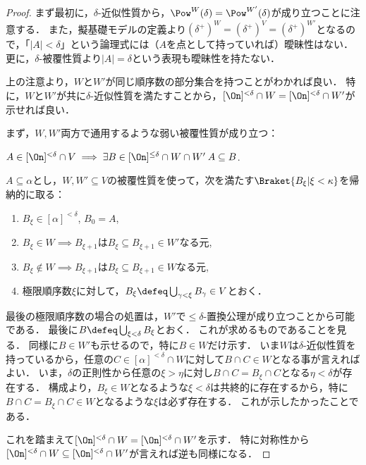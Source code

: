 \documentclass[a4j,leqno]{ltjsarticle}
\theoremstyle{nonumberplain}
\begin{document}
\begin{proof}
 まず最初に，$\delta$-近似性質から，$\Pow^W(\delta) = \Pow^{W'}(\delta)$が成り立つことに注意する．
 また，擬基礎モデルの定義より$(\delta^+)^W = (\delta^+)^V =  (\delta^+)^{W'}$となるので，「$|A| < \delta$」という論理式には（$A$を点として持っていれば）曖昧性はない．
 更に，$\delta$-被覆性質より$|A| = \delta$という表現も曖昧性を持たない．

 上の注意より，$W$と$W'$が同じ順序数の部分集合を持つことがわかれば良い．
 特に，$W$と$W'$が共に$\delta$-近似性質を満たすことから，$[\On]^{<\delta} \cap W = [\On]^{<\delta} \cap W'$が示せれば良い．
 
 まず，$W, W'$両方で通用するような弱い被覆性質が成り立つ：
 \begin{claim}
  $A \in [\On]^{<\delta} \cap V \implies \exists B \in [\On]^{\leq \delta} \cap W \cap W'\: A \subseteq B$.
 \end{claim}
 \begin{subproof}
  $A \subseteq \alpha$とし，$W, W' \subseteq V$の被覆性質を使って，次を満たす$\Braket{B_\xi | \xi < \kappa}$を帰納的に取る：
  \begin{enumerate}
   \item $B_\xi \in [\alpha]^{<\delta}$, $B_0 = A$,
   \item $B_\xi \in W \implies B_{\xi + 1}$は$B_\xi \subseteq B_{\xi+1} \in W'$なる元,
   \item $B_\xi \notin W \implies B_{\xi + 1}$は$B_\xi \subseteq B_{\xi+1} \in W$なる元,
   \item 極限順序数$\xi$に対して，$B_\xi \defeq \bigcup_{\gamma < \xi} B_\gamma \in V$とおく．
  \end{enumerate}
  最後の極限順序数の場合の処置は，$W'$で$\leq\delta$-置換公理が成り立つことから可能である．
  最後に$B \defeq \bigcup_{\xi < \delta} B_\xi$とおく．
  これが求めるものであることを見る．
  同様に$B \in W'$も示せるので，特に$B \in W$だけ示す．
  いま$W$は$\delta$-近似性質を持っているから，任意の$C \in [\alpha]^{<\delta} \cap W$に対して$B \cap C \in W$となる事が言えればよい．
  いま，$\delta$の正則性から任意の$\xi > \eta$に対し$B \cap C = B_\xi \cap C$となる$\eta < \delta$が存在する．
  構成より，$B_\xi \in W$となるような$\xi < \delta$は共終的に存在するから，特に$B \cap C = B_\xi \cap C \in W$となるような$\xi$は必ず存在する．
  これが示したかったことである．
 \end{subproof}
 これを踏まえて$[\On]^{<\delta} \cap W = [\On]^{<\delta} \cap W'$を示す．
 特に対称性から$[\On]^{<\delta} \cap W \subseteq [\On]^{<\delta} \cap W'$が言えれば逆も同様になる．

\end{proof}
\end{document}
